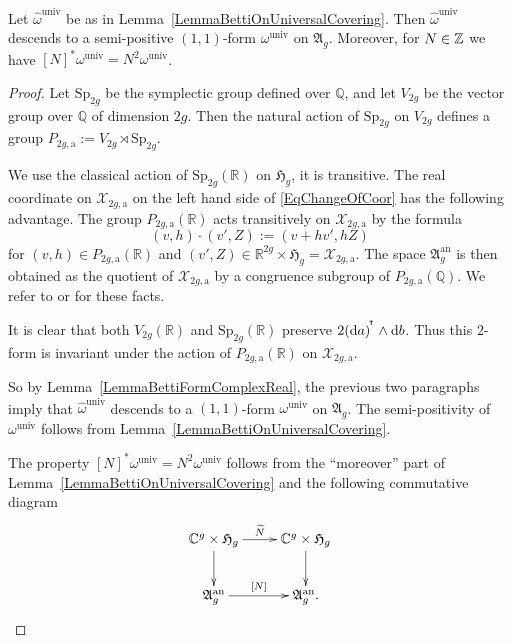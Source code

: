 \begin{lemma}\label{LemmaBettiFormUnivAb}
Let $\hat{\omega}^{\mathrm{univ}}$ be as in
Lemma~\ref{LemmaBettiOnUniversalCovering}. Then
$\hat{\omega}^{\mathrm{univ}}$ descends to a  semi-positive
$(1,1)$-form $\omega^{\mathrm{univ}}$ on $\mathfrak{A}_g$. Moreover,
for $N\in{\mathbb{Z}}$  we have $[N]^*\omega^{\mathrm{univ}} = N^2 \omega^{\mathrm{univ}}$.
\end{lemma}
\begin{proof}
Let $\mathrm{Sp}_{2g}$ be the symplectic group defined over $\mathbb Q$, and let $V_{2g}$ be the vector group over $\mathbb Q$ of dimension $2g$. Then the natural action of $\mathrm{Sp}_{2g}$ on $V_{2g}$ defines a group $P_{2g,\mathrm{a}}:= V_{2g} \rtimes \mathrm{Sp}_{2g}$.

We use the classical action of $\mathrm{Sp}_{2g}(\mathbb R)$  on
$\mathfrak{H}_g$, it is transitive. The real coordinate on $\mathcal X_{2g,\mathrm{a}}$ on the left hand side of \eqref{EqChangeOfCoor} has the following advantage. The group $P_{2g,\mathrm{a}}(\mathbb R)$ acts transitively on $\mathcal X_{2g,\mathrm{a}}$ by the formula
\[
(v,h) \cdot (v',Z) := (v+hv',hZ)
\]
for $(v,h) \in P_{2g,\mathrm{a}}(\mathbb R)$ and $(v',Z) \in \mathbb R^{2g} \times \mathfrak{H}_g = \mathcal X_{2g,\mathrm{a}}$. The space $\mathfrak{A}_g^{\mathrm{an}}$ is then obtained as the quotient of $\mathcal X_{2g,\mathrm{a}}$ by a congruence subgroup of $P_{2g,\mathrm{a}}(\mathbb Q)$. We refer to \cite[10.5--10.9]{PinkThesis} or \cite[Construction~2.9 and Example~2.12]{Pink05} for these facts.


It is clear that both $V_{2g}(\mathbb R)$ and
$\mathrm{Sp}_{2g}(\mathbb R)$ preserve $2{{(\mathrm{d} a)}}^{\!^{\intercal}} \wedge \mathrm{d} b$. Thus this $2$-form is invariant under the action of $P_{2g,\mathrm{a}}(\mathbb R)$ on $\mathcal X_{2g,\mathrm{a}}$.

So by Lemma~\ref{LemmaBettiFormComplexReal}, the previous two paragraphs imply that $\hat{\omega}^{\mathrm{univ}}$ descends to a $(1,1)$-form $\omega^{\mathrm{univ}}$ on $\mathfrak{A}_g$. The semi-positivity of $\omega^{\mathrm{univ}}$ follows from Lemma~\ref{LemmaBettiOnUniversalCovering}.

The property $[N]^*\omega^{\mathrm{univ}} = N^2 \omega^{\mathrm{univ}}$ follows from the ``moreover'' part of Lemma~\ref{LemmaBettiOnUniversalCovering} and the following commutative diagram
\[
\begin{gathered}[b]
\xymatrix{
\IC^g \times \mathfrak{H}_g \ar[r]^-{\widetilde{N}} \ar[d] & \IC^g \times \mathfrak{H}_g \ar[d] \\
\an{\mathfrak{A}}_g \ar[r]^-{[N]} & \an{\mathfrak{A}}_g.
}\\[-\dp\strutbox]
\end{gathered}
\qedhere
\]
\end{proof}



